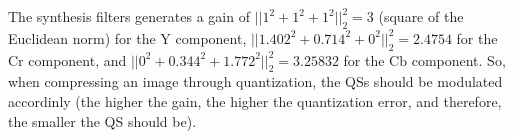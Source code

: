The synthesis filters generates a gain of $||1^2 + 1^2 + 1^2||_2^2=3$
(square of the Euclidean norm) for the $\text{Y}$ component, $||1.402^2 + 0.714^2 +
0^2||_2^2=2.4754$ for the $\text{Cr}$ component, and $||0^2 + 0.344^2+
1.772^2||_2^2=3.25832$ for the $\text{Cb}$ component. So, when
compressing an image through quantization, the QSs should be modulated
accordinly (the higher the gain, the higher the quantization error,
and therefore, the smaller the QS should be).

\begin{comment}
\subsubsection{Quantization}
After analyzing the frame (representing it in the YCrCb domain), the
next natural step is quantization. Unfortunately, the RGB/YCrCb
transform is not orthogonal\footnote{The RGB/YCrCb is not orthogonal
because, for example, as we can see in the
Eq.~\ref{eq:YCrCb_analysis}, the value of Cr depends on the value of
Y, and therefore, there is a dependency between both
\href{https://en.wikipedia.org/wiki/Basis_(linear_algebra)}{basis}.}
and therefore the contribution of each channel to the quality of the
reconstructed image $\tilde{X}$ are not additive (this can be seen in
this
\href{https://github.com/Sistemas-Multimedia/Sistemas-Multimedia.github.io/blob/master/study_guide/06-color_transform/performance.ipynb}{notebook}). For
that reason, and only for the sake of simplicity, we will use
\begin{equation}
  \Delta_{\text{Y}} = \Delta_{\text{Cr}} = \Delta_{\text{Cb}}.
  \label{eq:simple_Q}
\end{equation}
\end{comment}

